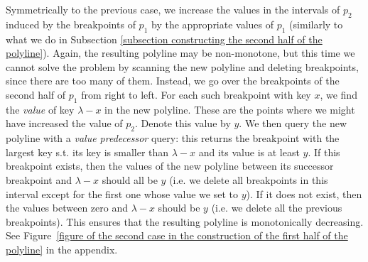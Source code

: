 \documentclass[a4paper,UKenglish]{lipics-v2016}
\theoremstyle{plain}
\begin{document}

\vspace{0.04in} 
Symmetrically to the previous case, we increase the values in the intervals of $p_2$ induced by the breakpoints of $p_1$ by the appropriate values of $p_{1}$ (similarly to what we do in Subsection \ref{subsection constructing the second half of the polyline}). Again, the resulting polyline may be non-monotone, but this time we cannot solve the problem by scanning the new polyline and deleting breakpoints, since there are too many of them. Instead, we go over the breakpoints of the second half of $p_1$ from right to left. For each such breakpoint  with key $x$, we find the {\em value} of key $\lambda - x$ in the new polyline. These are the points where we might have increased the value of $p_2$. Denote this value by $y$. We then query the new polyline with a \emph{value predecessor} query: this returns the breakpoint   with the largest key s.t. its key is smaller than $\lambda - x$ and its value is at least $y$. 
%
If this breakpoint exists, then the values of the new polyline between its successor breakpoint and $\lambda - x$ should all be $y$ (i.e. we delete all breakpoints in this interval except for the first one whose value we set to $y$). %
If it does not exist, then the values between zero and $\lambda - x$ should be $y$ (i.e. we delete all the previous breakpoints). 
This ensures that the resulting polyline is monotonically decreasing. 
See  Figure~\ref{figure of the second case in the construction of the first half of the polyline} in the appendix.
\end{document}
